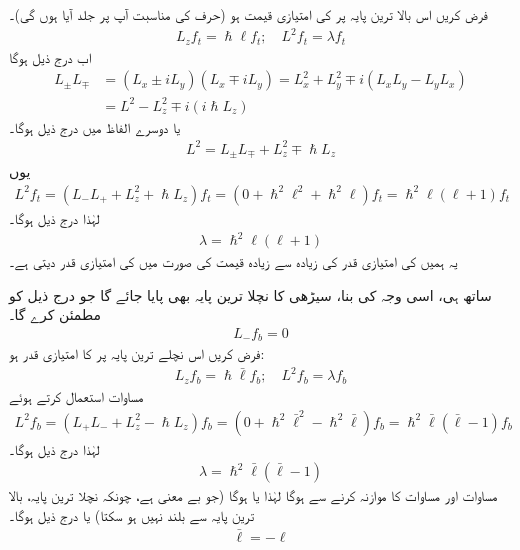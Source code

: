 فرض کریں اس بالا ترین پایہ پر  کی امتیازی قیمت  ہو (حرف  کی مناسبت آپ پر جلد آیا ہوں گی)۔ 
\begin{align}
L_z f_t = \hslash \ell f_{t}; \quad L^2 f_t = \lambda f_t
\end{align}
اب درج ذیل ہوگا 
\begin{align*} 
L_{\pm} L_{\mp}&= (L_x \pm i L_y) (L_x \mp i L_y) = L_x^2 + L_y^2 \mp i (L_x L_y - L_y L_x) \\
&= L^2 - L_z^2 \mp i (i \hslash L_z)
\end{align*}
یا دوسرے الفاظ میں درج ذیل ہوگا۔
\begin{align}\label{مساوات_تین_ابعادی_مربع_بصورت_رفعت}
L^2 = L_{\pm} L_{\mp} + L_z^2 \mp \hslash L_z
\end{align}
یوں 
\begin{align*}
L^2 f_t = (L_{-} L_{+} + L_z^2 + \hslash L_z) f_t = (0 + \hslash^2 \ell^2 + \hslash^2 \ell) f_t = \hslash^2 \ell (\ell + 1) f_t
\end{align*}
لہٰذا درج ذیل ہوگا۔
\begin{align}\label{مساوات_تین_ابعادی_لمڈا_تعلق_الف}
\lambda = \hslash^2 \ell (\ell + 1)
\end{align}
یہ ہمیں  کی امتیازی قدر کی زیادہ سے زیادہ قیمت کی صورت میں  کی امتیازی قدر دیتی ہے۔

 ساتھ ہی، اسی وجہ کی بنا، سیڑھی کا نچلا ترین پایہ  بھی پایا جائے گا جو درج ذیل کو مطمئن کرے گا۔ 
\begin{align}
L_{-} f_b = 0
\end{align}
فرض کریں اس نچلے ترین پایہ پر  کا امتیازی قدر  ہو:
\begin{align}
L_z f_b = \hslash \bar{\ell} f_b ; \quad L^2 f_b = \lambda f_b
\end{align}
مساوات  استعمال کرتے ہوئے
\begin{align*}
L^2 f_b = (L_{+} L_{-} + L_z^2 - \hslash L_z ) f_b = (0 + \hslash^2 \bar{\ell}^{2} - \hslash^2 \bar{\ell}) f_b = \hslash^2 \bar{\ell} (\bar{\ell} - 1) f_b
\end{align*}
لہٰذا درج ذیل ہوگا۔
\begin{align}\label{مساوات_تین_ابعادی_لمڈا_تعلق_ب}
\lambda = \hslash^2 \bar{\ell} (\bar{\ell} - 1)
\end{align}
مساوات  اور مساوات  کا موازنہ کرنے سے  ہوگا لہٰذا یا  ہوگا (جو بے معنی ہے، چونکہ نچلا ترین پایہ، بالا ترین پایہ سے بلند نہیں ہو سکتا) یا درج ذیل ہوگا۔
\begin{align}
\bar{\ell} = - \ell
\end{align}

